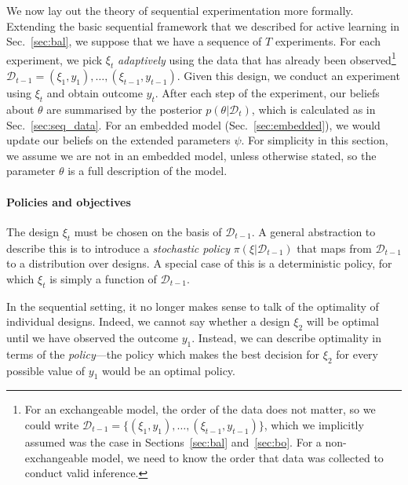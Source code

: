 \documentclass[a4paper, 10pt]{report}
\theoremstyle{plain}
\begin{document}
	We now lay out the theory of sequential experimentation more formally.
	Extending the basic sequential framework that we described for active learning in Sec.~\ref{sec:bal}, we suppose that we have a sequence of $T$ experiments.
	For each experiment, we pick $\xi_t$ \emph{adaptively} using the data that has already been observed\footnote{For an exchangeable model, the order of the data does not matter, so we could write $\mathcal{D}_{t-1} = \{(\xi_1,y_1),\dots,(\xi_{t-1},y_{t-1})\}$, which we implicitly assumed was the case in Sections~\ref{sec:bal} and~\ref{sec:bo}. For a non-exchangeable model, we need to know the order that data was collected to conduct valid inference.} $\mathcal{D}_{t-1} = (\xi_1,y_1),\dots,(\xi_{t-1},y_{t-1})$.
	Given this design, we conduct an experiment using $\xi_t$ and obtain outcome $y_t$.
	After each step of the experiment, our beliefs about $\theta$ are summarised by the posterior $p(\theta|\mathcal{D}_t)$, which is calculated as in Sec.~\ref{sec:seq_data}. For an embedded model (Sec.~\ref{sec:embedded}), we would update our beliefs on the extended parameters $\psi$.
	For simplicity in this section, we assume we are not in an embedded model, unless otherwise stated, so the parameter $\theta$ is a full description of the model.
	
	\paragraph{Policies and objectives}
	The design $\xi_t$ must be chosen on the basis of $\mathcal{D}_{t-1}$.
	A general abstraction to describe this is to introduce a \emph{stochastic policy} $\pi(\xi|\mathcal{D}_{t-1})$ that maps from $\mathcal{D}_{t-1}$ to a distribution over designs.
	A special case of this is a deterministic policy, for which $\xi_t$ is simply a function of $\mathcal{D}_{t-1}$.
	
	
	In the sequential setting, it no longer makes sense to talk of the optimality of individual designs.
	Indeed, we cannot say whether a design $\xi_2$ will be optimal until we have observed the outcome $y_1$.
	Instead, we can describe optimality in terms of the \emph{policy}---the policy which makes the best decision for $\xi_2$ for every possible value of $y_1$ would be an optimal policy.
	
\end{document}
